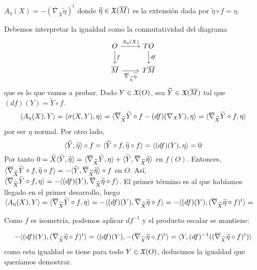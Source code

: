 \documentclass[GSR.tex]{subfiles}
\begin{document}
\begin{prop}
$A_\eta(X)=-(\overline{\nabla}_{\widetilde{X}}\widetilde{\eta})^t$ donde $\widetilde{\eta}\in{\mathfrak{X}}(\overline{M})$ es la extensión dada por $\widetilde{\eta}\circ f=\eta$. 
\end{prop}
\begin{dem}
Debemos interpretar la igualdad como la conmutatividad del diagrama
\[
\begin{tikzcd}
O\arrow[r, "A_\eta(X)"]\arrow[d, "f"] & TO\arrow[d, "df"]\\
\overline{M}\arrow[r, "\overline{\nabla}_{\widetilde{X}}\widetilde{\eta}"'] & T\overline{M}
\end{tikzcd}
\]
que es lo que vamos a probar. Dado $Y\in{\mathfrak{X}}(O)$, sea $\widetilde{Y}\in{\mathfrak{X}}(\overline{M})$ tal que $(df)(Y)=\widetilde{Y}\circ f$. 
\[
\langle{A_\eta(X),Y}\rangle=\langle{\sigma(X,Y),\eta}\rangle=\langle{\overline{\nabla}_{\widetilde{X}}\widetilde{Y}\circ f-(df)(\nabla_XY),\eta}\rangle=\langle{\overline{\nabla}_{\widetilde{X}}\widetilde{Y}\circ f,\eta}\rangle
\]
por ser $\eta$ normal. Por otro lado,
\[
\langle{\widetilde{Y},\widetilde{\eta}}\rangle\circ f=\langle{\widetilde{Y}\circ f,\widetilde{\eta}\circ f}\rangle=\langle{(df)(Y),\eta}\rangle=0
\]
Por tanto $0=\widetilde{X}\langle{\widetilde{Y},\widetilde{\eta}}\rangle=\langle{\overline{\nabla}_{\widetilde{X}}\widetilde{Y},\eta}\rangle+\langle{\widetilde{Y}, \overline{\nabla}_{\widetilde{X}}\widetilde{\eta}}\rangle$ en $f(O)$. Entonces, $\langle{\overline{\nabla}_{\widetilde{X}}\widetilde{Y}\circ f,\widetilde{\eta}\circ f}\rangle=-\langle{\widetilde{Y},\overline{\nabla}_{\widetilde{X}}\widetilde{\eta}}\rangle\circ f$ en $O$. Así, $\langle{\overline{\nabla}_{\widetilde{X}}\widetilde{Y}\circ f,\eta}\rangle=-\langle{(df)(Y),\overline{\nabla}_{\widetilde{X}}\widetilde{\eta}\circ f}\rangle$. El primer término es al que habíamos llegado en el primer desarrollo, luego $
\langle{A_\eta(X),Y}\rangle=\langle{\overline{\nabla}_{\widetilde{X}}\widetilde{Y}\circ f,\eta}\rangle=-\langle{(df)(Y),\overline{\nabla}_{\widetilde{X}}\widetilde{\eta}\circ f}\rangle=-\langle{(df)(Y),(\overline{\nabla}_{\widetilde{X}}\widetilde{\eta}\circ f)^t}\rangle=
$

Como $f$ es isometría, podemos aplicar $df^{-1}$ y el producto escalar se mantiene:

$$
-\langle{(df)(Y),(\overline{\nabla}_{\widetilde{X}}\widetilde{\eta}\circ f)^t}\rangle=\langle{(df)(Y),-(\overline{\nabla}_{\widetilde{X}}\widetilde{\eta}\circ f)^t}\rangle=\langle{Y,(df)^{-1}((\overline{\nabla}_{\widetilde{X}}\widetilde{\eta}\circ f)^t)}\rangle
$$
como esta igualdad se tiene para todo $Y\in{\mathfrak{X}}(O)$, deducimos la igualdad que queríamos demostrar. 
\end{dem}
\end{document}
